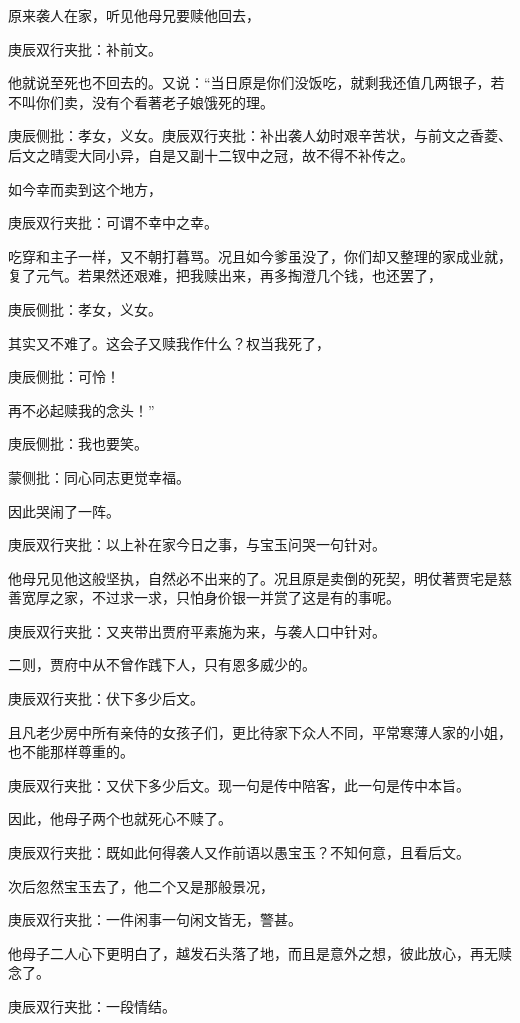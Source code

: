 \begin{parag}
\end{parag}


\begin{parag}


    原来袭人在家，听见他母兄要赎他回去，\begin{note}庚辰双行夹批：补前文。\end{note}他就说至死也不回去的。又说：“当日原是你们没饭吃，就剩我还值几两银子，若不叫你们卖，没有个看著老子娘饿死的理。\begin{note}庚辰侧批：孝女，义女。庚辰双行夹批：补出袭人幼时艰辛苦状，与前文之香菱、后文之晴雯大同小异，自是又副十二钗中之冠，故不得不补传之。\end{note}如今幸而卖到这个地方，\begin{note}庚辰双行夹批：可谓不幸中之幸。\end{note}吃穿和主子一样，又不朝打暮骂。况且如今爹虽没了，你们却又整理的家成业就，复了元气。若果然还艰难，把我赎出来，再多掏澄几个钱，也还罢了，\begin{note}庚辰侧批：孝女，义女。\end{note}其实又不难了。这会子又赎我作什么？权当我死了，\begin{note}庚辰侧批：可怜！\end{note}再不必起赎我的念头！”\begin{note}庚辰侧批：我也要笑。\end{note}\begin{note}蒙侧批：同心同志更觉幸福。\end{note}因此哭闹了一阵。\begin{note}庚辰双行夹批：以上补在家今日之事，与宝玉问哭一句针对。\end{note}
\end{parag}


\begin{parag}


    他母兄见他这般坚执，自然必不出来的了。况且原是卖倒的死契，明仗著贾宅是慈善宽厚之家，不过求一求，只怕身价银一并赏了这是有的事呢。\begin{note}庚辰双行夹批：又夹带出贾府平素施为来，与袭人口中针对。\end{note}二则，贾府中从不曾作践下人，只有恩多威少的。\begin{note}庚辰双行夹批：伏下多少后文。\end{note}且凡老少房中所有亲侍的女孩子们，更比待家下众人不同，平常寒薄人家的小姐，也不能那样尊重的。\begin{note}庚辰双行夹批：又伏下多少后文。现一句是传中陪客，此一句是传中本旨。\end{note}因此，他母子两个也就死心不赎了。\begin{note}庚辰双行夹批：既如此何得袭人又作前语以愚宝玉？不知何意，且看后文。\end{note}次后忽然宝玉去了，他二个又是那般景况，\begin{note}庚辰双行夹批：一件闲事一句闲文皆无，警甚。\end{note}他母子二人心下更明白了，越发石头落了地，而且是意外之想，彼此放心，再无赎念了。\begin{note}庚辰双行夹批：一段情结。\end{note}
\end{parag}



